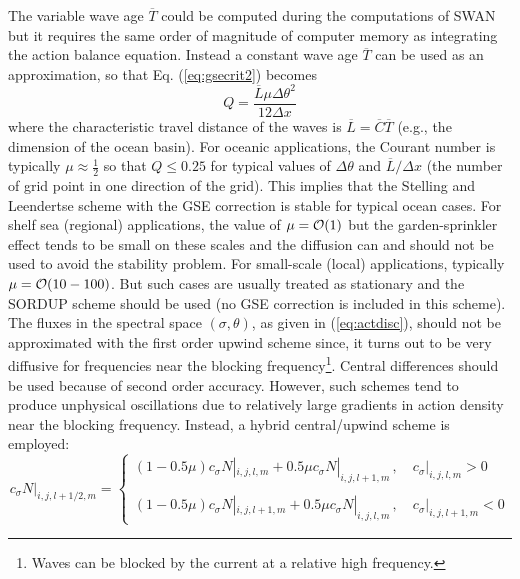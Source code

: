 \documentclass[12pt]{book}
\begin{document}
The variable wave age $\overline{T}$ could be computed during the computations of SWAN but it requires the same order of magnitude of computer memory as
integrating the action balance equation. Instead a constant wave age $\overline{T}$ can be used as an approximation, so that Eq. (\ref{eq:gsecrit2})
becomes
\begin{equation}
  Q = \frac{{\overline L} \mu \Delta \theta^2}{12 \Delta x}
\end{equation}
where the characteristic travel distance of the waves is ${\overline L} = {\overline C}{\overline T}$ (e.g., the dimension of the ocean basin). For
oceanic applications, the Courant number is typically $\mu \approx \frac{1}{2}$ so that $Q \leq 0.25$ for typical values of $\Delta \theta$ and
${\overline L}/\Delta x$ (the number of grid point in one direction of the grid). This implies that the Stelling and Leendertse scheme with the
GSE correction is stable for typical ocean cases. For shelf sea (regional) applications, the value of $\mu = {\cal O} (1)$ but the garden-sprinkler
effect tends to be small on these scales and the diffusion can and should not be used to avoid the stability problem. For small-scale (local)
applications, typically $\mu = {\cal O} (10-100)$. But such cases are usually treated as stationary and the SORDUP scheme should be used (no GSE
correction is included in this scheme).
\\[2ex]
\noindent
The fluxes in the spectral space $(\sigma,\theta)$, as given in (\ref{eq:actdisc}), should not be approximated
with the first order upwind scheme since, it turns out to be very diffusive for frequencies near the blocking
frequency\footnote{Waves can be blocked by the current at a relative high frequency.}. Central differences
should be used because of second order accuracy. However, such schemes tend to produce unphysical oscillations
due to relatively large gradients in action density near the blocking frequency. Instead, a hybrid
central/upwind scheme is employed:
\begin{equation}
  c_\sigma N|_{i,j,l+1/2,m} = \left\{
                               \begin{array}{l}
                                (1 - 0.5 \mu) c_\sigma N|_{i,j,l,m} + 0.5 \mu c_\sigma N|_{i,j,l+1,m}\,,
                                \quad c_\sigma|_{i,j,l,m} > 0 \\
                                \\
                                (1 - 0.5 \mu) c_\sigma N|_{i,j,l+1,m} + 0.5 \mu c_\sigma N|_{i,j,l,m}\,,
                                \quad c_\sigma|_{i,j,l+1,m} < 0
                              \end{array}
                             \right.
  \label{eq:fluxs}
\end{equation}
\end{document}
